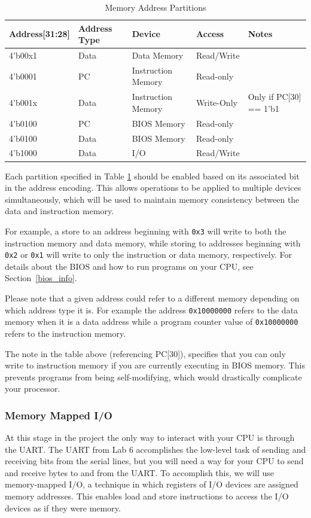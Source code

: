 \documentclass[11pt]{article}
\begin{document}
\begin{table}[hbt]
  \begin{center}
    \caption{Memory Address Partitions}
    \label{mem_space1}
    \begin{tabular}{l l l l l}
      \bottomrule
      \textbf{Address[31:28]} & \textbf{Address Type} & \textbf{Device} & \textbf{Access} & \textbf{Notes} \\
      \midrule
      4'b00x1 & Data & Data Memory & Read/Write &\\
      4'b0001 & PC  &  Instruction Memory & Read-only &\\
      4'b001x & Data & Instruction Memory & Write-Only & Only if PC[30] == 1'b1\\
      4'b0100 & PC  & BIOS Memory & Read-only &\\
      4'b0100 & Data & BIOS Memory & Read-only &\\
      4'b1000 & Data & I/O & Read/Write &\\
      \bottomrule
    \end{tabular}
  \end{center}
\end{table}

Each partition specified in Table \ref{mem_space1} should be enabled based on its associated bit in the address encoding.
This allows operations to be applied to multiple devices simultaneously, which will be used to maintain memory consistency between the data and instruction memory.

For example, a store to an address beginning with \verb|0x3| will write to both the instruction memory and data memory, while storing to addresses beginning with \verb|0x2| or \verb|0x1| will write to only the instruction or data memory, respectively.
For details about the BIOS and how to run programs on your CPU, see Section~\ref{bios_info}.

Please note that a given address could refer to a different memory depending on which address type it is.
For example the address \verb|0x10000000| refers to the data memory when it is a data address while a program counter value of \verb|0x10000000| refers to the instruction memory.

The note in the table above (referencing PC[30]), specifies that you can only write to instruction memory if you are currently executing in BIOS memory.
This prevents programs from being self-modifying, which would drastically complicate your processor.

\subsubsection{Memory Mapped I/O}
\label{mmio}
At this stage in the project the only way to interact with your CPU is through the UART.
The UART from Lab 6 accomplishes the low-level task of sending and receiving bits from the serial lines, but you will need a way for your CPU to send and receive bytes to and from the UART.
To accomplish this, we will use memory-mapped I/O, a technique in which registers of I/O devices are assigned memory addresses.
This enables load and store instructions to access the I/O devices as if they were memory.
\end{document}
